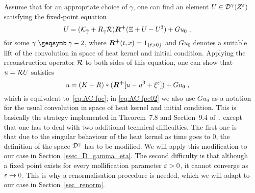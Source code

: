 \documentclass[reqno,11pt]{article}
\def\Rplus{\boldsymbol{R^+}}
\def\fraks{\mathfrak{s}}
\begin{document}
\begin{center}
\end{center}



Assume that for an appropriate choice of $\gamma$, one can find an element
$U\in{\mathcal D}^\gamma(Z^\varepsilon)$ satisfying the fixed-point equation 
\begin{equation}
 \label{eq:AC-fpe01}
 U = (\cK_{\bar\gamma} + R_\gamma\cR) \Rplus (\Xi + U - U^3) + Gu_0\;,
\end{equation} 
for some $\bar\gamma\geqs\gamma-2$, where $\Rplus(t,x)=\indexfct{t>0}$ and
$Gu_0$ denotes a suitable lift of the convolution in space of heat kernel
and initial condition.
Applying the reconstruction operator ${\mathcal R}$ to both sides of this equation, one
can show that $u={\mathcal R} U$ satisfies 
\begin{equation}
 \label{eq:AC-fpe02}
 u = (K+R)*(\Rplus[u-u^3+\xi^\eps]) + Gu_0\;,
\end{equation} 
which is equivalent to~\eqref{eq:AC-fpe}; in \eqref{eq:AC-fpe02} we also use
$Gu_0$ as a notation for the usual convolution in space of heat kernel and
initial condition. This is basically the strategy implemented in Theorem~7.8 and
Section~9.4 of~\cite{Hairer2014}, except that one has to deal with two
additional technical difficulties. The first one is that due to the singular
behaviour of the heat kernel as time goes to $0$, the definition of the space
${\mathcal D}^\gamma$ has to be modified. We will apply this modification to our case in
Section~\ref{ssec_D_gamma_eta}. The second difficulty is that although a fixed
point exists for every mollification parameter $\varepsilon>0$, it cannot converge as
$\varepsilon\to0$. This is why a renormalisation procedure is needed, which we will
adapt to our case in Section~\ref{sec_renorm}. 

\end{document}
